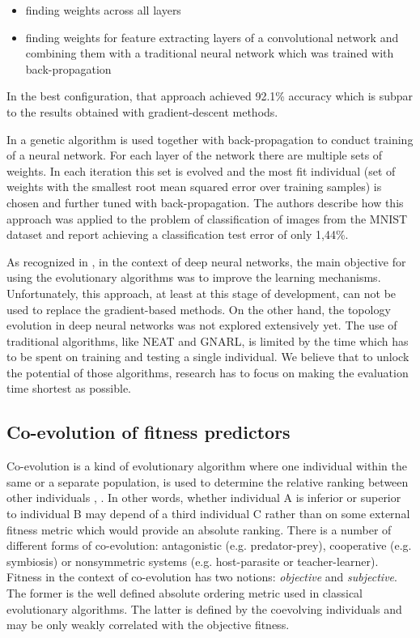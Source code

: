 \documentclass{llncs}
\begin{document}
\begin{itemize}
    \item finding weights across all layers
    \item finding weights for feature extracting layers of a convolutional network and combining them with a traditional neural network which was trained with back-propagation
\end{itemize}

In the best configuration, that approach achieved 92.1\% accuracy which is subpar to the results obtained with gradient-descent methods. 

In \cite{David2014} a genetic algorithm is used together with back-propagation to conduct training of a neural network. For each layer of the network there are multiple sets of weights. In each iteration this set is evolved and the most fit individual (set of weights with the smallest root mean squared error over training samples) is chosen and further tuned with back-propagation. The authors describe how this approach was applied to the problem of classification of images from the MNIST dataset and report achieving a classification test error of only 1,44\%. 

As recognized in \cite{Tirumala2014}, in the context of deep neural networks, the main objective for using the evolutionary algorithms was to improve the learning mechanisms. Unfortunately, this approach, at least at this stage of development, can not be used to replace the gradient-based methods. On the other hand, the topology evolution in deep neural networks was not explored extensively yet. The use of traditional algorithms, like NEAT and GNARL, is limited by the time which has to be spent on training and testing a single individual. We believe that to unlock the potential of those algorithms, research has to focus on making the evaluation time shortest as possible.

\subsection{Co-evolution of fitness predictors}

Co-evolution is a kind of evolutionary algorithm where one individual within the same or a separate population, is used to determine the relative ranking between other individuals \cite{Bongard2005}, \cite{Olsson2001}. In other words, whether individual A is inferior or superior to individual B may depend of a third individual C rather than on some external fitness metric which would provide an absolute ranking. There is a number of different forms of co-evolution: antagonistic (e.g. predator-prey), cooperative (e.g. symbiosis) or nonsymmetric systems (e.g. host-parasite or teacher-learner). Fitness in the context of co-evolution has two notions: \emph{objective} and \emph{subjective}. The former is the well defined absolute ordering metric used in classical evolutionary algorithms. The latter is defined by the coevolving individuals and may be only weakly correlated with the objective fitness. 
\end{document}
